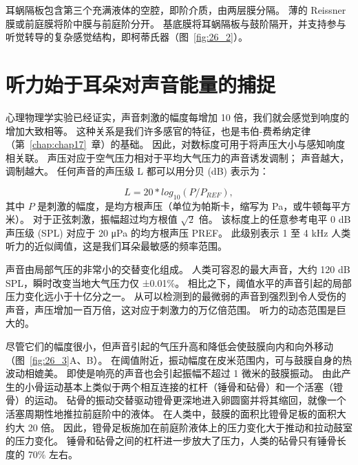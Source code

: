 耳蜗隔板包含第三个充满液体的空腔，即阶介质，由两层膜分隔。
薄的 Reissner 膜或前庭膜将阶中膜与前庭阶分开。
基底膜将耳蜗隔板与鼓阶隔开，并支持参与听觉转导的复杂感觉结构，即柯蒂氏器（图~\ref{fig:26_2}）。



\section{听力始于耳朵对声音能量的捕捉}

心理物理学实验已经证实，声音刺激的幅度每增加 10 倍，我们就会感觉到响度的增加大致相等。
这种关系是我们许多感官的特征，也是韦伯-费希纳定律（第~\ref{chap:chap17}~章）的基础。
因此，对数标度可用于将声压大小与感知响度相关联。 
声压对应于空气压力相对于平均大气压力的声音诱发调制；
声音越大，调制越大。
任何声音的声压级 L 都可以用分贝 (dB) 表示为：

\begin{equation}\label{sound_pressure}
	L = 20 * log_10 (P/P_{REF}),
\end{equation}
%
其中 $P$ 是刺激的幅度，是均方根声压（单位为帕斯卡，缩写为 Pa，或牛顿每平方米）。 
对于正弦刺激，振幅超过均方根值 $ \sqrt{2}$ 倍。 
该标度上的任意参考电平 0 dB 声压级 (SPL) 对应于 20 μPa 的均方根声压 PREF。
此级别表示 1 至 4 kHz 人类听力的近似阈值，这是我们耳朵最敏感的频率范围。


声音由局部气压的非常小的交替变化组成。
人类可容忍的最大声音，大约 120 dB SPL，瞬时改变当地大气压力仅 ±0.01\%。
相比之下，阈值水平的声音引起的局部压力变化远小于十亿分之一。
从可以检测到的最微弱的声音到强烈到令人受伤的声音，声压增加一百万倍，这对应于刺激力的万亿倍范围。
听力的动态范围是巨大的。


尽管它们的幅度很小，但声音引起的气压升高和降低会使鼓膜向内和向外移动（图~\ref{fig:26_3}A、B）。
在阈值附近，振动幅度在皮米范围内，可与鼓膜自身的热波动相媲美。
即使是响亮的声音也会引起振幅不超过 1 微米的鼓膜振动。
由此产生的小骨运动基本上类似于两个相互连接的杠杆（锤骨和砧骨）和一个活塞（镫骨）的运动。
砧骨的振动交替驱动镫骨更深地进入卵圆窗并将其缩回，就像一个活塞周期性地推拉前庭阶中的液体。
在人类中，鼓膜的面积比镫骨足板的面积大约大 20 倍。
因此，镫骨足板施加在前庭阶液体上的压力变化大于推动和拉动鼓室的压力变化。
锤骨和砧骨之间的杠杆进一步放大了压力，人类的砧骨只有锤骨长度的 70\% 左右。


